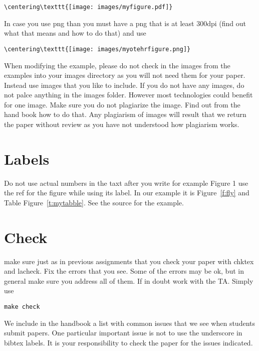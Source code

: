 \begin{verbatim}
\centering\texttt{[image: images/myfigure.pdf]}
\end{verbatim}

In case you use png than you must have a png that is at least 300dpi
(find out what that means and how to do that) and use 

\begin{verbatim}
\centering\texttt{[image: images/myotehrfigure.png]}
\end{verbatim}

When modifying the example, please do not check in the images from the
examples into your images directory as you will not need them for your
paper. Instead use images that you like to include. If you do not have
any images, do not palce anything in the images folder. However most
technologies could benefit for one image. Make sure you do not
plagiarize the image. Find out from the hand book how to do that. Any
plagiarism of images will result that we return the paper without
review as you have not understood how plagiarism works.


\section{Labels}

Do not use actual numbers in the taxt after you write for example
Figure 1 use the ref for the figure while using its label. In our
example it is Figure~\ref{f:fly} and Table Figure~\ref{t:mytabble}.
See the source for the example.

\section{Check}

make sure just as in previous assignments that you check your paper
with chktex and lacheck. Fix the errors that you see. Some of the
errors may be ok, but in general make sure you address all of them. If
in doubt work with the TA. Simply use

\begin{verbatim}
make check
\end{verbatim}

We include in the handbook a list with common issues that we see when
students submit papers. One particular important issue is not to use
the underscore in bibtex labels. It is your responsibility to check
the paper for the issues indicated.

